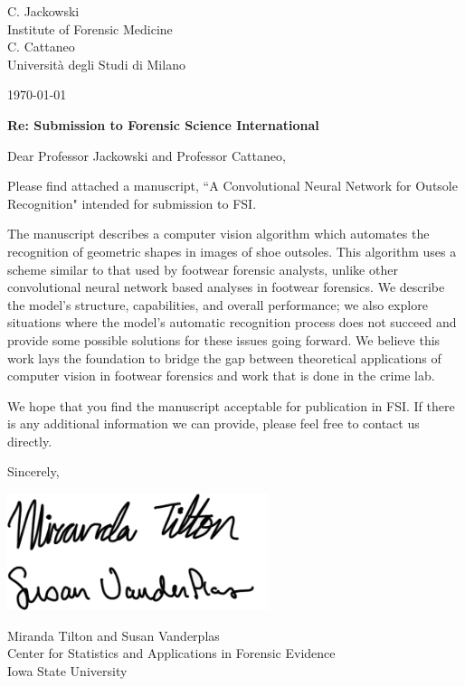 \documentclass[11pt]{article}
\begin{document}
C. Jackowski \\
Institute of Forensic Medicine\vspace{.5em}\\
C. Cattaneo \\
Università degli Studi di Milano \vspace{2em}

\today\\\vspace{1em}

{\bf Re: Submission to Forensic Science International}\\\vspace{2em}

Dear Professor Jackowski and Professor Cattaneo, \vspace{1em}

Please find attached a manuscript, ``A Convolutional Neural Network for Outsole Recognition" intended for submission to FSI. \vspace{1em}

The manuscript describes a computer vision algorithm which automates the recognition of geometric shapes in images of shoe outsoles. This algorithm uses a scheme similar to that used by footwear forensic analysts, unlike other convolutional neural network based analyses in footwear forensics. We describe the model's structure, capabilities, and overall performance; we also explore situations where the model's automatic recognition process does not succeed and provide some possible solutions for these issues going forward. We believe this work lays the foundation to bridge the gap between theoretical applications of computer vision in footwear forensics and work that is done in the crime lab. \vspace{1em}

We hope that you find the manuscript acceptable for publication in FSI. If there is any additional information we can provide, please feel free to contact us directly. \vspace{0.25in}

Sincerely,\\
\begin{minipage}{.25\linewidth}
\vspace*{.5cm}
\includegraphics[width=3in,keepaspectratio=TRUE]{signature}
\vspace*{.5cm}
\end{minipage}

Miranda Tilton and Susan Vanderplas\\
Center for Statistics and Applications in Forensic Evidence\\
Iowa State University
\end{document}
